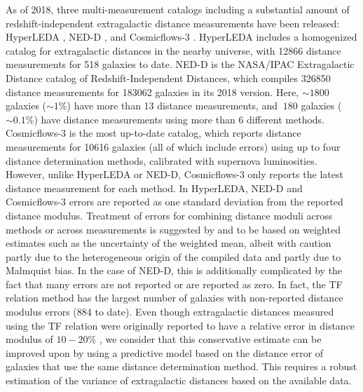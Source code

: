 \documentclass[a4paper,fleqn,usenatbib]{mnras}
\begin{document}
As of 2018, three multi-measurement catalogs including a substantial amount of redshift-independent extragalactic distance measurements have been released: HyperLEDA \citep{hyperleda}, NED-D \citep{ned07,ned}, and Cosmicflows-3 \citep{cosmicflows}. HyperLEDA includes a homogenized catalog for extragalactic distances in the nearby universe, with 12866 distance measurements for 518 galaxies to date. NED-D is the NASA/IPAC Extragalactic Distance catalog of Redshift-Independent Distances, which compiles 326850 distance measurements for 183062 galaxies in its 2018 version. Here, $\sim1800$ galaxies ($\sim1$\%) have more than 13 distance measurements, and $~180$ galaxies ($\sim0.1$\%) have distance measurements using more than 6 different methods. Cosmicflows-3 is the most up-to-date catalog, which reports distance measurements for 10616 galaxies (all of which include errors) using up to four distance determination methods, calibrated with supernova luminosities. However, unlike HyperLEDA or NED-D, Cosmicflows-3 only reports the latest distance measurement for each method. In HyperLEDA, NED-D and Cosmicflows-3 errors are reported as one standard deviation from the reported distance modulus. Treatment of errors for combining distance moduli across methods or across measurements is suggested by \citet{ned07} and \citet{cosmicflows} to be based on weighted estimates such as the uncertainty of the weighted mean, albeit with caution partly due to the heterogeneous origin of the compiled data and partly due to Malmquist bias. In the case of NED-D, this is additionally complicated by the fact that many errors are not reported or are reported as zero. In fact, the TF relation method has the largest number of galaxies with non-reported distance modulus errors (884 to date). Even though extragalactic distances measured using the TF relation were originally reported to have a relative error in distance modulus of $10-20$\% \citep{tforig}, we consider that this conservative estimate can be improved upon by using a predictive model based on the distance error of galaxies that use the same distance determination method. This requires a robust estimation of the variance of extragalactic distances based on the available data.\\
\end{document}
